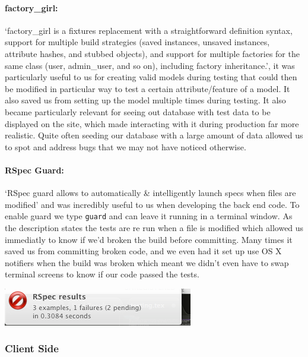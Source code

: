     \paragraph{factory\_girl:}
      `factory\_girl is a fixtures replacement with a straightforward definition syntax, support for multiple build strategies (saved instances, unsaved instances, attribute hashes, and stubbed objects), and support for multiple factories for the same class (user, admin\_user, and so on), including factory inheritance.'\cite{factory-girl}, it was particularly useful to us for creating valid models during testing that could then be modified in particular way to test a certain attribute/feature of a model.
      It also saved us from setting up the model multiple times during testing.
      It also became particularly relevant for seeing out database with test data to be displayed on the site, which made interacting with it during production far more realistic. Quite often seeding our database with a large amount of data allowed us to spot and address bugs that we may not have noticed otherwise.

    \paragraph{RSpec Guard:}
      `RSpec guard allows to automatically \& intelligently launch specs when files are modified'\cite{guard} and was incredibly useful to us when developing the back end code. To enable guard we type \verb!guard! and can leave it running in a terminal window. As the description states the tests are re run when a file is modified which allowed us immediatly to know if we'd broken the build before committing.
      Many times it saved us from committing broken code, and we even had it set up use OS X notifiers when the build was broken which meant we didn't even have to swap terminal screens to know if our code passed the tests.

      \begin{center}
      \includegraphics[scale=0.5]{images/project_management/testing/guard_osx}
      \end{center}

  \subsubsection{Client Side}
